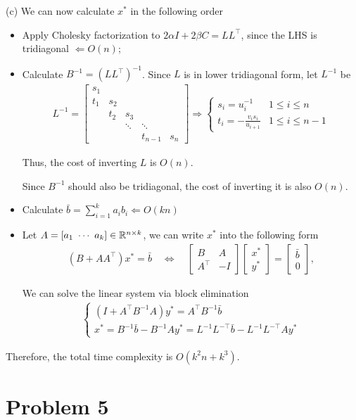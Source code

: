 \documentclass[11pt]{article}
\newcommand{\inv}{^{-1}}        %
\newcommand{\T}{^\top}          %
\begin{document}
(c)
We can now calculate $x^*$ in the following order
\begin{itemize}
  \item Apply Cholesky factorization to $2\alpha I + 2\beta C = LL\T$, since the LHS is tridiagonal $\Leftarrow O(n)$;
  \item Calculate $B\inv = (LL\T)\inv$. Since $L$ is in lower tridiagonal form, let $L\inv$ be
  \begin{align*}
    L\inv = 
    \begin{bmatrix}
      s_1 &     &     & \\
      t_1 & s_2 &     & \\
          & t_2 & s_3 & \\
          &     & \ddots & \ddots \\
          &     & & t_{n-1} & s_n
    \end{bmatrix}
    \Rightarrow 
    \begin{cases}
      s_i = u_i\inv & 1\leq i \leq n\\
      t_i = -\frac{v_i s_i}{u_{i+1}} & 1\leq i\leq n-1
    \end{cases}
  \end{align*}

  Thus, the cost of inverting $L$ is $O(n)$. 

  Since $B\inv$ should also be tridiagonal, the cost of inverting it is also $O(n)$.
  \item Calculate $\bar{b} = \sum_{i=1}^{k} a_i b_i \Leftarrow O(kn)$
  \item Let $A = [a_1\ \cdots \ a_k] \in{{\mathbb{R}}}^{n\times k}$, we can write $x^*$ into the following form
  \begin{align*}
    (B + AA\T) x^* = \bar{b} \quad \Leftrightarrow \quad
    \begin{bmatrix}
      B & A\\ A\T & -I
    \end{bmatrix}
    \begin{bmatrix}
      x^*\\ y^*
    \end{bmatrix}
    = 
    \begin{bmatrix}
      \bar{b}\\ 0
    \end{bmatrix},
  \end{align*}
  
  We can solve the linear system via block elimination
  \begin{align*}
    \begin{cases}
      (I + A\T B\inv A) y^* = A\T B\inv \bar{b}\\      
      x^* = B\inv \bar{b} - B\inv A y^* = L\inv L^{-\top} \bar{b} - L\inv L^{-\top} Ay^*
    \end{cases}
  \end{align*}
\end{itemize}
  
Therefore, the total time complexity is $O(k^2n + k^3)$.

\clearpage
\section*{Problem 5}
\end{document}
